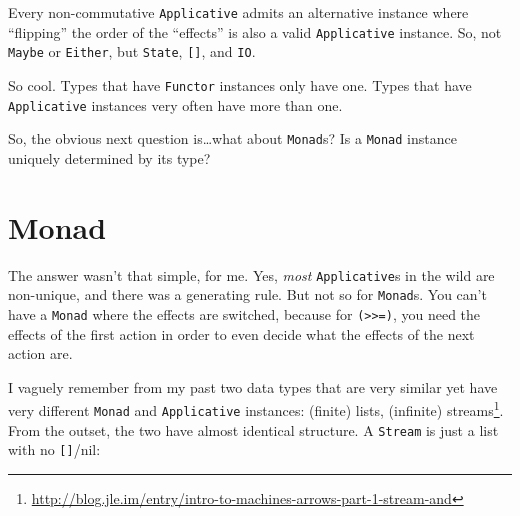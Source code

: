 \documentclass[]{article}
\newenvironment{Shaded}{}{}
\newcommand{\KeywordTok}[1]{\textcolor[rgb]{0.00,0.44,0.13}{\textbf{{#1}}}}
\newcommand{\DataTypeTok}[1]{\textcolor[rgb]{0.56,0.13,0.00}{{#1}}}
\newcommand{\CommentTok}[1]{\textcolor[rgb]{0.38,0.63,0.69}{\textit{{#1}}}}
\newcommand{\OtherTok}[1]{\textcolor[rgb]{0.00,0.44,0.13}{{#1}}}
\newcommand{\FunctionTok}[1]{\textcolor[rgb]{0.02,0.16,0.49}{{#1}}}
\newcommand{\NormalTok}[1]{{#1}}
\renewcommand{\href}[2]{#2\footnote{\url{#1}}}
\begin{document}
Every non-commutative \texttt{Applicative} admits an alternative instance where
``flipping'' the order of the ``effects'' is also a valid \texttt{Applicative}
instance. So, not \texttt{Maybe} or \texttt{Either}, but \texttt{State},
\texttt{{[}{]}}, and \texttt{IO}.

\begin{Shaded}
\end{Shaded}

So cool. Types that have \texttt{Functor} instances only have one. Types that
have \texttt{Applicative} instances very often have more than one.

So, the obvious next question is\ldots{}what about \texttt{Monad}s? Is a
\texttt{Monad} instance uniquely determined by its type?

\section{Monad}\label{monad}

The answer wasn't that simple, for me. Yes, \emph{most} \texttt{Applicative}s in
the wild are non-unique, and there was a generating rule. But not so for
\texttt{Monad}s. You can't have a \texttt{Monad} where the effects are switched,
because for \texttt{(\textgreater{}\textgreater{}=)}, you need the effects of
the first action in order to even decide what the effects of the next action
are.

I vaguely remember from my past two data types that are very similar yet have
very different \texttt{Monad} and \texttt{Applicative} instances: (finite)
lists, (infinite)
\href{http://blog.jle.im/entry/intro-to-machines-arrows-part-1-stream-and}{streams}.
From the outset, the two have almost identical structure. A \texttt{Stream} is
just a list with no \texttt{{[}{]}}/nil:
\end{document}
